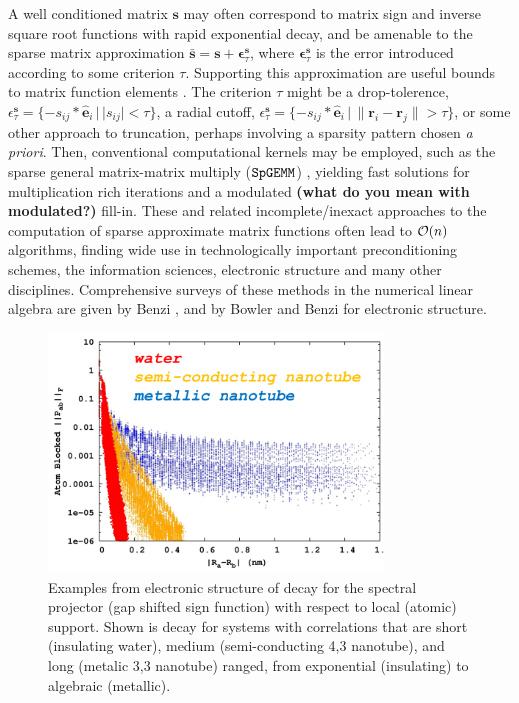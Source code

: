 \documentclass[letterpaper,twocolumn,amsmath,amsfont,amssymb,english,aps,jcp,preprintnumbers,groupaddress,nofootinbib,tightenlines]{revtex4}
\newcommand{\mat}[1]{\boldsymbol{#1}}
\begin{document}
A well conditioned matrix $\mat{s}$ may often correspond to matrix
sign and inverse square root functions with rapid exponential decay,
and be amenable to the sparse matrix approximation
$\bar{\mat{s}} = \mat{s}+ \mat{\epsilon}^{\mat{s}}_\tau$,
where $\mat{\epsilon}^{\mat{s}}_\tau$ is the error introduced
according to some criterion $\tau$.  Supporting this approximation are
useful bounds to matrix function elements \cite{Benzi99b, }.
The criterion $\tau$ might be a drop-tolerence,
$\epsilon^{\mat{s}}_{\tau} = \{-s_{ij}*\hat{\mat{e}}_i \, | \, |s_{ij}|<\tau \}$,
a radial cutoff,
$\epsilon^{\mat{s}}_{\tau} = \{-s_{ij}*\hat{\mat{e}}_i \, | \, \lVert \mat{r}_i - \mat{r}_j \rVert > \tau \}$,
or some other approach to truncation, perhaps involving a sparsity
pattern chosen {\em a priori}.
Then, conventional computational kernels may be employed, such as the
sparse general matrix-matrix multiply ($\tt{SpGEMM}$)
\cite{Gustavson78, Toledo97, challacombe00, bowler00}, yielding fast
solutions for multiplication rich iterations and a modulated {\bf
  (what do you mean with modulated?)} fill-in.
These and related incomplete/inexact approaches to the computation of
sparse approximate matrix functions often lead to ${\cal O}(n)$
algorithms, finding wide use in technologically important
preconditioning schemes, the information sciences, electronic
structure and many other disciplines. Comprehensive surveys of these
methods in the numerical linear algebra are given by Benzi
\cite{Benzi99,Benzi02}, and by Bowler \cite{Bowler12} and Benzi \cite{Benzi13}
for electronic structure.

\begin{figure}[t]\label{figure1}
 \includegraphics[width=3.5in]{decay_picture.png}
  \caption{Examples from electronic structure of decay for the
    spectral projector (gap shifted sign function) with respect to
    local (atomic) support.  Shown is decay for systems with
    correlations that are short (insulating water), medium
    (semi-conducting 4,3 nanotube), and long (metalic 3,3 nanotube)
    ranged, from exponential (insulating) to algebraic (metallic). }
\end{figure}
\end{document}
